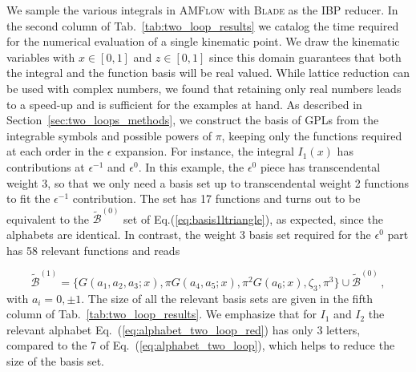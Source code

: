 \documentclass[a4paper,11pt]{article}
\begin{document}
We sample the various integrals in \textsc{AMFlow} with \textsc{Blade} as the IBP reducer. In the second column of Tab.~\ref{tab:two_loop_results} we catalog the time required for the numerical evaluation of a single kinematic point. We draw the kinematic variables with $x\in[0,1]$ and $z\in [0,1]$ since this domain guarantees that both the integral and the function basis will be real valued. While  lattice reduction can be used with complex numbers, we found that retaining only real numbers leads to a speed-up and is sufficient for the examples at hand. As described in Section~\ref{sec:two_loops_methods}, we construct the basis of GPLs from the integrable symbols and possible powers of $\pi$, keeping only the functions required at each order in the $\epsilon$ expansion. For instance, the integral $I_1(x)$ has contributions at $\epsilon^{-1}$ and $\epsilon^{0}$. In this example, the $\epsilon^0$ piece has transcendental weight 3, so that we only need a basis set up to transcendental weight 2 functions to fit the $\epsilon^{-1}$ contribution. The set has 17 functions and turns out to be equivalent to the $\tilde{\mathcal{B}}^{(0)}$ set of Eq.(\ref{eq:basis1ltriangle}), as expected, since the alphabets are identical. In contrast, the weight 3 basis set required for the $\epsilon^0$ part has 58 relevant functions and reads 

\begin{equation}\label{eq:basis2ltriangle}
  \tilde{\mathcal{B}}^{(1)}  = \{ G(a_1, a_2, a_3; x),  \pi G(a_4, a_5; x) , \pi^2 G(a_6;x), \zeta_3, \pi^3\} \cup \tilde{\mathcal{B}}^{(0)} \,,
\end{equation}
with $a_i=0, \pm 1$. The size of all the relevant basis sets are given in the fifth column of Tab.~\ref{tab:two_loop_results}. We emphasize that for $I_1$ and $I_2$ the relevant alphabet Eq.~(\ref{eq:alphabet_two_loop_red}) has only 3 letters, compared to the 7 of Eq.~(\ref{eq:alphabet_two_loop}), which helps to reduce the size of the basis set. 
\end{document}
